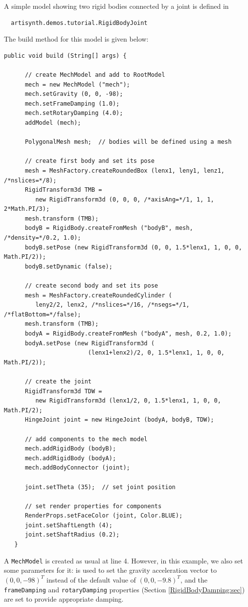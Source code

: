 A simple model showing two rigid bodies connected by
a joint is defined in
%
\begin{verbatim}
  artisynth.demos.tutorial.RigidBodyJoint
\end{verbatim}
%

The build method for this model is given below:
\lstset{numbers=left}
\begin{lstlisting}[]
   public void build (String[] args) {

      // create MechModel and add to RootModel
      mech = new MechModel ("mech");
      mech.setGravity (0, 0, -98);
      mech.setFrameDamping (1.0);
      mech.setRotaryDamping (4.0);
      addModel (mech);

      PolygonalMesh mesh;  // bodies will be defined using a mesh

      // create first body and set its pose
      mesh = MeshFactory.createRoundedBox (lenx1, leny1, lenz1, /*nslices=*/8);
      RigidTransform3d TMB = 
         new RigidTransform3d (0, 0, 0, /*axisAng=*/1, 1, 1, 2*Math.PI/3);
      mesh.transform (TMB);
      bodyB = RigidBody.createFromMesh ("bodyB", mesh, /*density=*/0.2, 1.0);
      bodyB.setPose (new RigidTransform3d (0, 0, 1.5*lenx1, 1, 0, 0, Math.PI/2));
      bodyB.setDynamic (false);

      // create second body and set its pose
      mesh = MeshFactory.createRoundedCylinder (
         leny2/2, lenx2, /*nslices=*/16, /*nsegs=*/1, /*flatBottom=*/false);
      mesh.transform (TMB);
      bodyA = RigidBody.createFromMesh ("bodyA", mesh, 0.2, 1.0);
      bodyA.setPose (new RigidTransform3d (
                        (lenx1+lenx2)/2, 0, 1.5*lenx1, 1, 0, 0, Math.PI/2));

      // create the joint      
      RigidTransform3d TDW = 
         new RigidTransform3d (lenx1/2, 0, 1.5*lenx1, 1, 0, 0, Math.PI/2);
      HingeJoint joint = new HingeJoint (bodyA, bodyB, TDW);

      // add components to the mech model
      mech.addRigidBody (bodyB);
      mech.addRigidBody (bodyA);
      mech.addBodyConnector (joint);

      joint.setTheta (35);  // set joint position

      // set render properties for components
      RenderProps.setFaceColor (joint, Color.BLUE);
      joint.setShaftLength (4);
      joint.setShaftRadius (0.2);
   }
\end{lstlisting}
\lstset{numbers=none}

A {\tt MechModel} is created as usual at line 4. However, in this
example, we also set some parameters for it:
 is
used to set the gravity acceleration vector to $(0, 0, -98)^T$ instead
of the default value of $(0, 0, -9.8)^T$, and the {\tt frameDamping}
and {\tt rotaryDamping} properties (Section
\ref{RigidBodyDamping:sec}) are set to provide appropriate damping.


